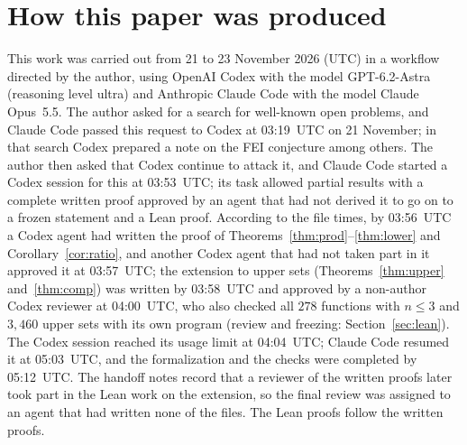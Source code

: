 \documentclass[11pt]{article}
\theoremstyle{definition}
\theoremstyle{remark}
\begin{document}
\section*{How this paper was produced}
This work was carried out from 21 to 23 November 2026 (UTC) in a workflow
directed by the author, using OpenAI Codex with the model GPT-6.2-Astra
(reasoning level ultra) and Anthropic Claude Code with the model Claude
Opus~5.5. The author asked for a search for well-known open problems, and
Claude Code passed this request to Codex at 03:19~UTC on 21 November; in that
search Codex prepared a note on the FEI conjecture among others. The author
then asked that Codex continue to attack it, and Claude Code started a Codex
session for this at 03:53~UTC; its task allowed partial results with a complete
written proof approved by an agent that had not derived it to go on to a frozen
statement and a Lean proof. According to the file times, by 03:56~UTC a Codex
agent had written the proof of Theorems~\ref{thm:prod}--\ref{thm:lower} and
Corollary~\ref{cor:ratio}, and another Codex agent that had not taken part in
it approved it at 03:57~UTC; the extension to upper sets
(Theorems~\ref{thm:upper} and~\ref{thm:comp}) was written by 03:58~UTC and
approved by a non-author Codex reviewer at 04:00~UTC, who also checked all
$278$ functions with $n\le3$ and $3{,}460$ upper sets with its own program
(review and freezing: Section~\ref{sec:lean}). The Codex session reached its usage limit at 04:04~UTC;
Claude Code resumed it at 05:03~UTC, and the formalization and the checks were
completed by 05:12~UTC. The handoff notes record that a reviewer of the
written proofs later took part in the Lean work on the extension, so the final
review was assigned to an agent that had written none of the files. The Lean proofs
follow the written proofs.
\end{document}
